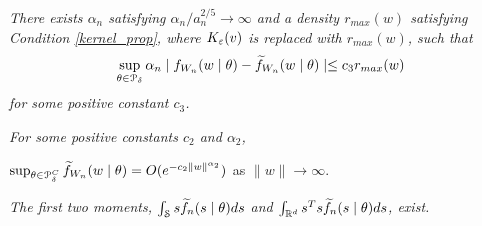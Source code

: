	
	\begin{condition} \label{sum_approx}
		{\it There exists $\alpha_{n}$ satisfying $\alpha_{n}/a_{n}^{2/5}\rightarrow\infty$
		and a density $r_{max}(w)$ satisfying Condition \ref{kernel_prop}, where $K_{\varepsilon}(v)$
		is replaced with $r_{max}(w)$, such that 
		$$\sup_{\theta\in {\cal P}_{\delta} }\alpha_{n}\mid f_{W_{n}}(w\mid\theta)-\widetilde{f}_{W_{n}}(w\mid\theta)\mid\leq c_{3}r_{max}(w)$$
		for some positive constant $c_{3}$. }
	\end{condition}
	
	\begin{condition} \label{sum_approx_tail}
		{\it  For some positive constants $c_{2}$
		and $\alpha_{2}$,
		

$\sup_{\theta\in {\cal P}_{\delta} ^{C}}\widetilde{f}_{W_{n}}(w\mid\theta)=O(e^{-c_{2}\|w\|^{\alpha_{2}}})$
		as $\|w\|\rightarrow\infty$. }
	\end{condition}
	
	\begin{condition} \label{cond:likelihood_moments}
		{\it The first two moments, $\int_{{\cal S} }s\widetilde{f}_{n}(s\mid\theta)ds$
		and $\int_{\mathbb{R}^d}s^{T}s\widetilde{f}_{n}(s\mid\theta)ds$, exist. }
	\end{condition}
	